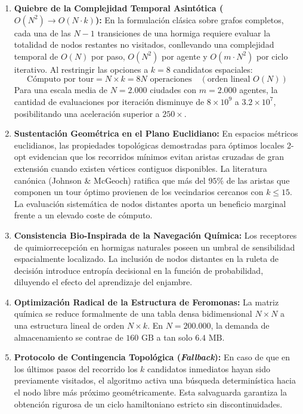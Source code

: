 \documentclass[11pt,a4paper]{article}
\begin{document}
\begin{enumerate}
    \item \textbf{Quiebre de la Complejidad Temporal Asintótica ($O(N^2) \to O(N \cdot k)$):}
    En la formulación clásica sobre grafos completos, cada una de las $N-1$ transiciones de una hormiga requiere evaluar la totalidad de nodos restantes no visitados, conllevando una complejidad temporal de $O(N)$ por paso, $O(N^2)$ por agente y $O(m \cdot N^2)$ por ciclo iterativo. Al restringir las opciones a $k=8$ candidatos espaciales:
    \begin{equation}
        \text{Cómputo por tour} = N \times k = 8N \text{ operaciones} \quad (\text{orden lineal } O(N))
    \end{equation}
    Para una escala media de $N = 2.000$ ciudades con $m = 2.000$ agentes, la cantidad de evaluaciones por iteración disminuye de $8 \times 10^9$ a $3.2 \times 10^7$, posibilitando una aceleración superior a $250\times$.

    \item \textbf{Sustentación Geométrica en el Plano Euclidiano:}
    En espacios métricos euclidianos, las propiedades topológicas demostradas para óptimos locales 2-opt evidencian que los recorridos mínimos evitan aristas cruzadas de gran extensión cuando existen vértices contiguos disponibles. La literatura canónica (Johnson \& McGeoch) ratifica que más del $95\%$ de las aristas que componen un tour óptimo provienen de los vecindarios cercanos con $k \le 15$. La evaluación sistemática de nodos distantes aporta un beneficio marginal frente a un elevado coste de cómputo.

    \item \textbf{Consistencia Bio-Inspirada de la Navegación Química:}
    Los receptores de quimiorrecepción en hormigas naturales poseen un umbral de sensibilidad espacialmente localizado. La inclusión de nodos distantes en la ruleta de decisión introduce entropía decisional en la función de probabilidad, diluyendo el efecto del aprendizaje del enjambre.

    \item \textbf{Optimización Radical de la Estructura de Feromonas:}
    La matriz química se reduce formalmente de una tabla densa bidimensional $N \times N$ a una estructura lineal de orden $N \times k$. En $N=200.000$, la demanda de almacenamiento se contrae de $160\text{ GB}$ a tan solo $6.4\text{ MB}$.

    \item \textbf{Protocolo de Contingencia Topológica (\emph{Fallback}):}
    En caso de que en los últimos pasos del recorrido los $k$ candidatos inmediatos hayan sido previamente visitados, el algoritmo activa una búsqueda determinística hacia el nodo libre más próximo geométricamente. Esta salvaguarda garantiza la obtención rigurosa de un ciclo hamiltoniano estricto sin discontinuidades.
\end{enumerate}
\end{document}
